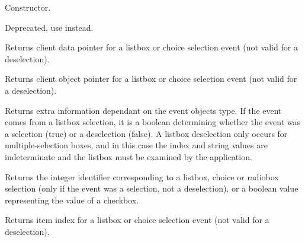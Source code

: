 
Constructor.

\label{wxcommandeventchecked}


Deprecated, use  instead.

\label{wxcommandeventgetclientdata}


Returns client data pointer for a listbox or choice selection event
(not valid for a deselection).

\label{wxcommandeventgetclientobject}


Returns client object pointer for a listbox or choice selection event
(not valid for a deselection).

\label{wxcommandeventgetextralong}


Returns extra information dependant on the event objects type.
If the event comes from a listbox selection, it is a boolean
determining whether the event was a selection (true) or a
deselection (false). A listbox deselection only occurs for
multiple-selection boxes, and in this case the index and string values
are indeterminate and the listbox must be examined by the application.

\label{wxcommandeventgetint}


Returns the integer identifier corresponding to a listbox, choice or
radiobox selection (only if the event was a selection, not a
deselection), or a boolean value representing the value of a checkbox.

\label{wxcommandeventgetselection}


Returns item index for a listbox or choice selection event (not valid for
a deselection).

\label{wxcommandeventgetstring}

